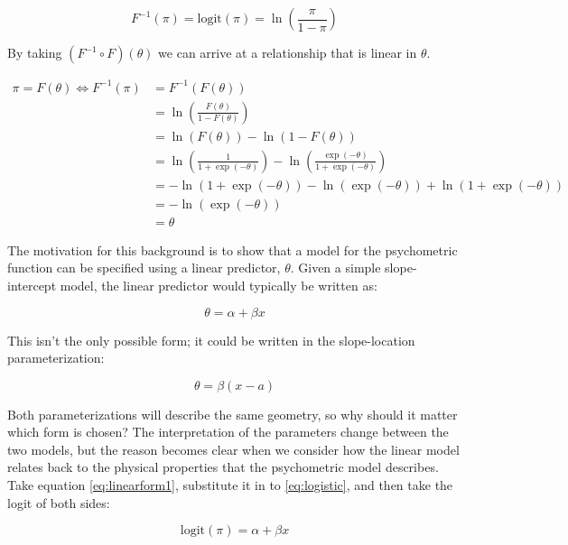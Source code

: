 \documentclass[11pt, oneside, openany]{scrbook}
\begin{document}
\begin{equation}
  F^{-1}(\pi) = \mathrm{logit}(\pi) = \ln\left(\frac{\pi}{1 - \pi}\right)
  \label{eq:logit}
\end{equation}

By taking \((F^{-1} \circ F)(\theta)\) we can arrive at a relationship that is linear in \(\theta\).


\begin{align*}
  \pi = F(\theta) \Longleftrightarrow F^{-1}(\pi) &= F^{-1}(F(\theta)) \\
  & = \ln\left(\frac{F(\theta)}{1 - F(\theta)}\right) \\
  &= \ln(F(\theta)) - \ln(1 - F(\theta)) \\
  &= \ln\left(\frac{1}{1 + \exp(-\theta)}\right) - \ln\left(\frac{\exp(-\theta)}{1 + \exp(-\theta)}\right) \\
  &= - \ln(1 + \exp(-\theta)) - \ln(\exp(-\theta)) + \ln(1 + \exp(-\theta)) \\
  &= - \ln(\exp(-\theta)) \\
  &= \theta
\end{align*}

The motivation for this background is to show that a model for the psychometric function can be specified using a linear predictor, \(\theta\). Given a simple slope-intercept model, the linear predictor would typically be written as:

\begin{equation}
  \theta = \alpha + \beta x
  \label{eq:linearform1}
\end{equation}

This isn't the only possible form; it could be written in the slope-location parameterization:

\begin{equation}
  \theta = \beta(x - a)
  \label{eq:linearform2}
\end{equation}

Both parameterizations will describe the same geometry, so why should it matter which form is chosen? The interpretation of the parameters change between the two models, but the reason becomes clear when we consider how the linear model relates back to the physical properties that the psychometric model describes. Take equation \eqref{eq:linearform1}, substitute it in to \eqref{eq:logistic}, and then take the logit of both sides:

\begin{equation}
  \mathrm{logit}(\pi) = \alpha+\beta x
  \label{eq:pfform1}
\end{equation}
\end{document}

